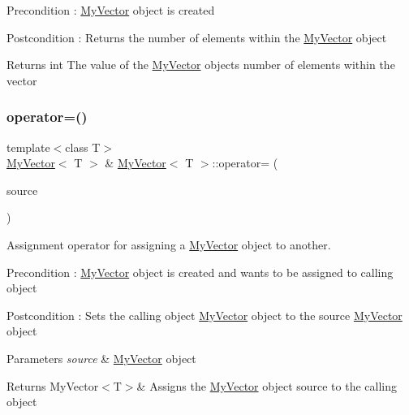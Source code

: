 \begin{DoxyPrecond}{Precondition}
\+: \mbox{\hyperlink{class_my_vector}{My\+Vector}} object is created 
\end{DoxyPrecond}
\begin{DoxyPostcond}{Postcondition}
\+: Returns the number of elements within the \mbox{\hyperlink{class_my_vector}{My\+Vector}} object 
\end{DoxyPostcond}
\begin{DoxyReturn}{Returns}
int The value of the \mbox{\hyperlink{class_my_vector}{My\+Vector}} object\textquotesingle{}s number of elements within the vector 
\end{DoxyReturn}
\mbox{\label{class_my_vector_a459ecae4c3fc3836415467db79bd0af2}} 
\subsubsection{\texorpdfstring{operator=()}{operator=()}}
{\footnotesize\ttfamily template$<$class T$>$ \\
\mbox{\hyperlink{class_my_vector}{My\+Vector}}$<$ T $>$ \& \mbox{\hyperlink{class_my_vector}{My\+Vector}}$<$ T $>$\+::operator= (\begin{DoxyParamCaption}\item[{const \mbox{\hyperlink{class_my_vector}{My\+Vector}}$<$ T $>$ \&}]{source }\end{DoxyParamCaption})}



Assignment operator for assigning a \mbox{\hyperlink{class_my_vector}{My\+Vector}} object to another. 

\begin{DoxyPrecond}{Precondition}
\+: \mbox{\hyperlink{class_my_vector}{My\+Vector}} object is created and want\textquotesingle{}s to be assigned to calling object 
\end{DoxyPrecond}
\begin{DoxyPostcond}{Postcondition}
\+: Sets the calling object \mbox{\hyperlink{class_my_vector}{My\+Vector}} object to the source \mbox{\hyperlink{class_my_vector}{My\+Vector}} object 
\end{DoxyPostcond}

\begin{DoxyParams}{Parameters}
{\em source} & \mbox{\hyperlink{class_my_vector}{My\+Vector}} object \\
\hline
\end{DoxyParams}
\begin{DoxyReturn}{Returns}
My\+Vector$<$\+T$>$\& Assigns the \mbox{\hyperlink{class_my_vector}{My\+Vector}} object source to the calling object 
\end{DoxyReturn}
\mbox{\label{class_my_vector_a52eca35ed558d978bf5a8541f9d0115c}} 
